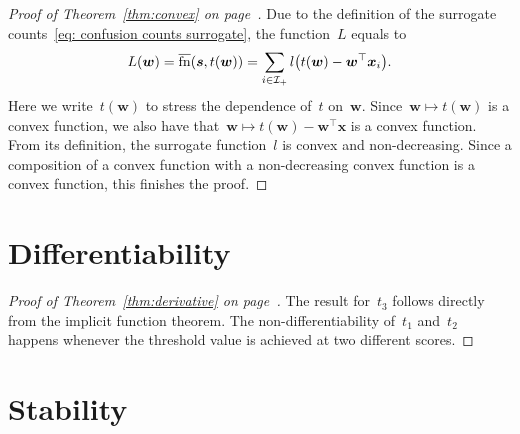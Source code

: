 \thmconvex*
\begin{proof}[Proof of Theorem~\ref{thm:convex} on page~\pageref{thm:convex}]
  Due to the definition of the surrogate counts~\eqref{eq: confusion counts surrogate}, the function~$L$ equals to
  \begin{equation*}
    L(\bm{w}) = \fns(\bm{s}, t(\bm{w})) = \sum_{i \in \Ipos} l \Brac{t(\bm{w}) - \bm{w}^{\top} \bm{x}_i}.
  \end{equation*}
  Here we write~$t(\bm{w})$ to stress the dependence of~$t$ on~$\bm{w}$. Since~$\bm{w}\mapsto t(\bm{w})$ is a convex function, we also have that~$\bm{w} \mapsto t(\bm{w}) - \bm{w}^{\top} \bm{x}$ is a convex function. From its definition, the surrogate function~$l$ is convex and non-decreasing. Since a composition of a convex function with a non-decreasing convex function is a convex function, this finishes the proof.
\end{proof}

\section{Differentiability}

\derivative* 
\begin{proof}[Proof of Theorem~\ref{thm:derivative} on page~\pageref{thm:derivative}]
  The result for~$t_3$ follows directly from the implicit function theorem. The non-differentiability of~$t_1$ and~$t_2$ happens whenever the threshold value is achieved at two different scores.
\end{proof}

\pagebreak

\section{Stability}\label{app: stability}

